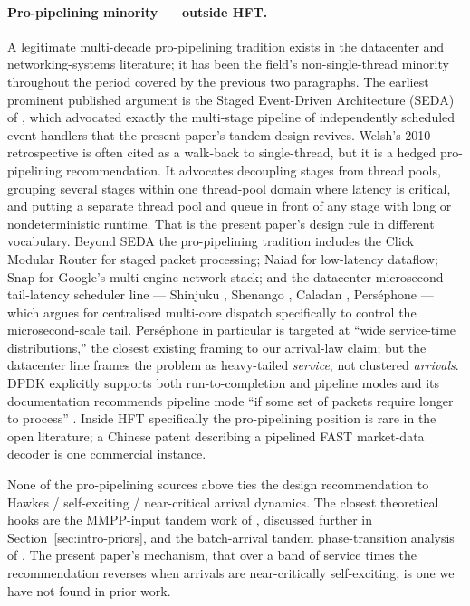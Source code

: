 \documentclass[11pt]{article}
\begin{document}
\paragraph{Pro-pipelining minority --- outside HFT.} A legitimate multi-decade
pro-pipelining tradition exists in the datacenter and networking-systems literature; it
has been the field's non-single-thread minority throughout the period covered by the
previous two paragraphs. The earliest prominent published argument is the Staged
Event-Driven Architecture (SEDA) of \citet{welsh2001seda}, which advocated exactly the
multi-stage pipeline of independently scheduled event handlers that the present paper's
tandem design revives. Welsh's 2010 retrospective \citep{welsh2010retrospective} is often cited as a walk-back
to single-thread, but it is a hedged pro-pipelining recommendation. It advocates
decoupling stages from thread pools, grouping several stages within one thread-pool
domain where latency is critical, and putting a separate thread pool and queue in front
of any stage with long or nondeterministic runtime. That is the present paper's design
rule in different vocabulary. Beyond SEDA the
pro-pipelining tradition includes the Click Modular Router \citep{kohler2000click} for
staged packet processing; Naiad \citep{murray2013naiad} for low-latency dataflow; Snap
\citep{marty2019snap} for Google's multi-engine network stack; and the datacenter
microsecond-tail-latency scheduler line --- Shinjuku \citep{kaffes2019shinjuku}, Shenango
\citep{ousterhout2019shenango}, Caladan \citep{fried2020caladan}, Perséphone
\citep{delimitrou2021persephone} --- which argues for centralised multi-core dispatch
specifically to control the microsecond-scale tail. Perséphone in particular is targeted
at ``wide service-time distributions,'' the closest existing framing to our arrival-law
claim; but the datacenter line frames the problem as heavy-tailed \emph{service}, not
clustered \emph{arrivals}. DPDK explicitly supports both run-to-completion and pipeline
modes and its documentation recommends pipeline mode ``if some set of packets require
longer to process'' \citep{dpdk}. Inside HFT specifically the pro-pipelining position is
rare in the open literature; a Chinese patent \citep{cn105654383a} describing a
pipelined FAST market-data decoder is one commercial instance.

None of the pro-pipelining sources above ties the design recommendation to Hawkes /
self-exciting / near-critical arrival dynamics. The closest theoretical hooks are the
MMPP-input tandem work of \citet{kimchydzinski2002mmpp}, discussed further in
Section~\ref{sec:intro-priors}, and the batch-arrival tandem phase-transition analysis of
\citet{tandembatch2014}. The present paper's mechanism, that over a band of service times the recommendation
reverses when arrivals are near-critically self-exciting, is one we have not found in
prior work.
\end{document}
